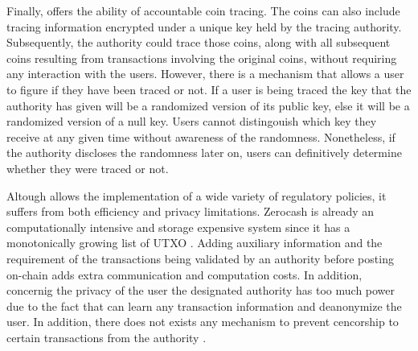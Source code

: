 Finally, \cite{GGM16} offers the ability of accountable coin tracing. The coins can also include tracing information encrypted under a unique key held by the tracing authority. Subsequently, the authority could trace those coins, along with all subsequent coins resulting from transactions involving the original coins, without requiring any interaction with the users. However, there is a mechanism that allows a user to figure if they have been traced or not. If a user is being traced the key that the authority has given will be a randomized version of its public key, else it will be a randomized version of a null key. Users cannot distingouish which key they receive at any given time without awareness of the randomness. Nonetheless, if the authority discloses the randomness later on, users can definitively determine whether they were traced or not. 

Altough \cite{GGM16} allows the implementation of a wide variety of regulatory policies, it suffers from both efficiency and privacy limitations. Zerocash is already an computationally intensive and storage expensive system since it has a monotonically growing list of UTXO \cite{SoKPrivacyPreservingComputing}. Adding auxiliary information and the requirement of the transactions being validated by an authority before posting on-chain adds extra communication and computation costs. In addition, concernig the privacy of the user the designated authority has too much power due to the fact that can learn any transaction information and deanonymize the user. In addition, there does not exists any mechanism to prevent cencorship to certain transactions from the authority \cite{SokAuditability}.